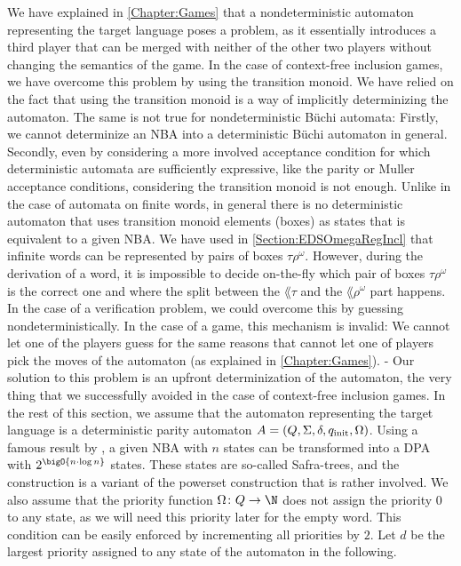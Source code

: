 \documentclass[../../diss.tex]{subfiles}
\begin{document}
We have explained in \cref{Chapter:Games} that a nondeterministic automaton representing the target language poses a problem, as it essentially introduces a third player that can be merged with neither of the other two players without changing the semantics of the game.
In the case of context-free inclusion games, we have overcome this problem by using the transition monoid.
We have relied on the fact that using the transition monoid is a way of implicitly determinizing the automaton.
The same is not true for nondeterministic Büchi automata:
Firstly, we cannot determinize an NBA into a deterministic Büchi automaton in general.
Secondly, even by considering a more involved acceptance condition for which deterministic automata are sufficiently expressive, like the parity or Muller acceptance conditions, considering the transition monoid is not enough.
Unlike in the case of automata on finite words, in general there is no deterministic automaton that uses transition monoid elements (boxes) as states that is equivalent to a given NBA.\@
We have used in \cref{Section:EDSOmegaRegIncl} that infinite words can be represented by pairs of boxes $\tau\rho^\omega$.
However, during the derivation of a word, it is impossible to decide on-the-fly which pair of boxes $\tau\rho^\omega$ is the correct one and where the split between the $\lang{\tau}$ and the $\lang{\rho}^\omega$ part happens.
In the case of a verification problem, we could overcome this by guessing nondeterministically.
In the case of a game, this mechanism is invalid:
We cannot let one of the players guess for the same reasons that cannot let one of players pick the moves of the automaton (as explained in \cref{Chapter:Games}).
-
Our solution to this problem is an upfront determinization of the automaton, the very thing that we successfully avoided in the case of context-free inclusion games.
In the rest of this section, we assume that the automaton representing the target language is a deterministic parity automaton $A = (Q, \Sigma, \delta, q_{\text{init}}, \Omega)$.
Using a famous result by , a given NBA with $n$ states can be transformed into a DPA with $2^{\bigO{n \cdot \log n}}$ states.
These states are so-called Safra-trees, and the construction is a variant of the powerset construction that is rather involved.
We also assume that the priority function $\Omega \colon Q \to \N$ does not assign the priority $0$ to any state, as we will need this priority later for the empty word.
This condition can be easily enforced by incrementing all priorities by $2$.
Let $d$ be the largest priority assigned to any state of the automaton in the following.
\end{document}
